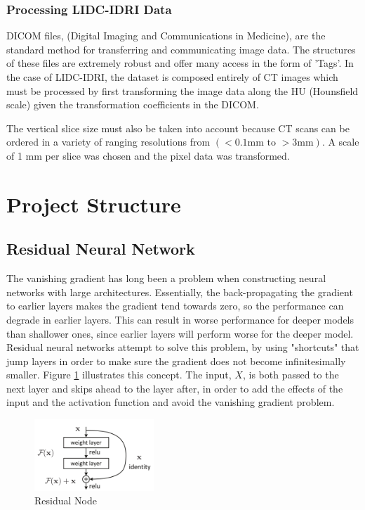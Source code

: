 \documentclass[10pt,twocolumn,letterpaper]{article}
\begin{document}
      \subsubsection{Processing LIDC-IDRI Data} \label{sec:data-lidc-processing}
         DICOM files, (Digital Imaging and Communications in Medicine), are the standard method for transferring
         and communicating image data. The structures of these files are extremely robust and offer many access in
         the form of 'Tags'. In the case of LIDC-IDRI, the dataset is composed entirely of CT images which must be
         processed by first transforming the image data along the HU (Hounsfield scale) given the transformation
         coefficients in the DICOM.

         The vertical slice size must also be taken into account because CT scans can be ordered in a variety of
         ranging resolutions from $(<0.1\text{mm to } >3 \text{mm})$. A scale of 1 mm per slice was chosen and the
         pixel data was transformed.

\section{Project Structure} \label{sec:struct}

   \subsection{Residual Neural Network} \label{sec:struct-cnn}
        The vanishing gradient has long been a problem when constructing neural networks with large architectures.
        Essentially, the back-propagating the gradient to earlier layers makes the gradient tend towards zero, so
        the performance can degrade in earlier layers. This can result in worse performance for deeper models than
        shallower ones, since earlier layers will perform worse for the deeper model. Residual neural networks attempt
        to solve this problem, by using "shortcuts" that jump layers in order to make sure the gradient does not become
        infinitesimally smaller. Figure \ref{fig:struct-cnn-residual} illustrates this concept. The input, $X$, is both
        passed to the next layer and skips ahead to the layer after, in order to add the effects of the input and the
        activation function and avoid the vanishing gradient problem.

        \begin{figure}[h]
            \centering
            \includegraphics[width=0.4\textwidth]{./images/residual.png}
            \caption{Residual Node}
            \label{fig:struct-cnn-residual}
        \end{figure}
\end{document}

